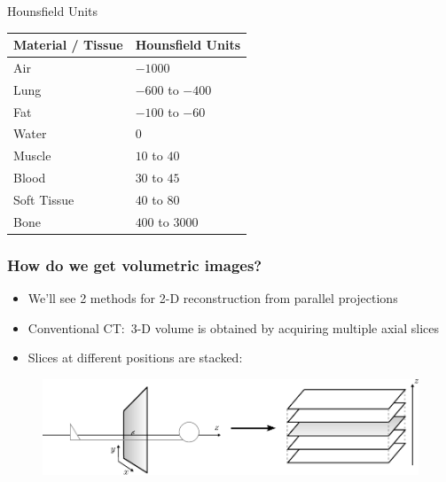 \begin{frame}[c]{Hounsfield Units}

	\begin{table}[tbp]
		\centering
		\begin{tabular}{ll}
			\toprule
			Material / Tissue & Hounsfield Units \\
			\midrule
			Air               & $-1000$          \\
			Lung              & $-600$ to $-400$ \\
			Fat               & $-100$ to $-60$  \\
			Water             & $0$              \\
			Muscle            & $10$ to $40$     \\
			Blood             & $30$ to $45$     \\
			Soft Tissue       & $40$ to $80$     \\
			Bone              & $400$ to $3000$  \\
			\bottomrule
		\end{tabular}%
		\label{tab:ct_reco_1}
	\end{table}

\end{frame}



\begin{frame}
	\frametitle{How do we get volumetric images?}

	\begin{itemize}
		\item We'll see 2 methods for 2-D reconstruction from parallel projections
		\item Conventional CT:\ 3-D volume is obtained by acquiring multiple axial slices
		\item Slices at different positions are stacked:

	\end{itemize}

	\begin{figure}[tbp]
		\centering
		\includegraphics[width=0.85\linewidth]{images/reco_1}%
		\label{fig:ct_reco_1}
	\end{figure}

\end{frame}

